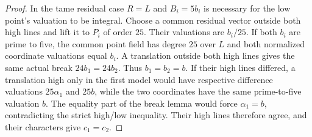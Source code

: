 \begin{proof}
In the tame residual case $R=L$ and $B_i=5b_i$ is necessary for
the low point's valuation to be integral. Choose a common residual
vector outside both high lines and lift it to $P_i$ of order $25$.
Their valuations are $b_i/25$. If both $b_i$ are prime to five,
the common point field has degree $25$ over $L$ and both normalized
coordinate valuations equal $b_i$. A translation outside both high
lines gives the same actual break $24b_1=24b_2$. Thus $b_1=b_2=b$.
If their high lines differed, a translation high only in the first
model would have respective difference valuations $25\alpha_1$
and $25b$, while the two coordinates have the same prime-to-five
valuation $b$. The equality part of the break lemma would force
$\alpha_1=b$, contradicting the strict high/low inequality.
Their high lines therefore agree, and their characters give $c_1=c_2$.
\end{proof}

